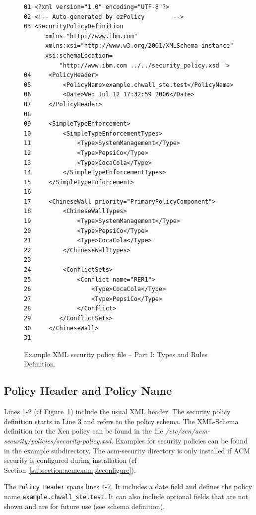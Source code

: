 \documentclass[11pt,twoside,final,openright]{report}
\begin{document}
\begin{figure}
\begin{scriptsize}
\begin{verbatim}
01 <?xml version="1.0" encoding="UTF-8"?>
02 <!-- Auto-generated by ezPolicy        -->
03 <SecurityPolicyDefinition
      xmlns="http://www.ibm.com"
      xmlns:xsi="http://www.w3.org/2001/XMLSchema-instance"
      xsi:schemaLocation=
          "http://www.ibm.com ../../security_policy.xsd ">
04     <PolicyHeader>
05         <PolicyName>example.chwall_ste.test</PolicyName>
06         <Date>Wed Jul 12 17:32:59 2006</Date>
07     </PolicyHeader>
08
09     <SimpleTypeEnforcement>
10         <SimpleTypeEnforcementTypes>
11             <Type>SystemManagement</Type>
12             <Type>PepsiCo</Type>
13             <Type>CocaCola</Type>
14         </SimpleTypeEnforcementTypes>
15     </SimpleTypeEnforcement>
16
17     <ChineseWall priority="PrimaryPolicyComponent">
18         <ChineseWallTypes>
19             <Type>SystemManagement</Type>
20             <Type>PepsiCo</Type>
21             <Type>CocaCola</Type>
22         </ChineseWallTypes>
23
24         <ConflictSets>
25             <Conflict name="RER1">
26                 <Type>CocaCola</Type>
27                 <Type>PepsiCo</Type>
28             </Conflict>
29        </ConflictSets>
30     </ChineseWall>
31
\end{verbatim}
\end{scriptsize}
\caption{Example XML security policy file -- Part I: Types and Rules Definition.}
\label{fig:acmxmlfilea}
\end{figure}

\subsection{Policy Header and Policy Name}
\label{subsection:acmnaming}
Lines 1-2 (cf Figure~\ref{fig:acmxmlfilea}) include the usual XML
header. The security policy definition starts in Line 3 and refers to
the policy schema. The XML-Schema definition for the Xen policy can be
found in the file
\textit{/etc/xen/acm-security/policies/security-policy.xsd}. Examples
for security policies can be found in the example subdirectory. The
acm-security directory is only installed if ACM security is configured
during installation (cf Section~\ref{subsection:acmexampleconfigure}).

The \verb|Policy Header| spans lines 4-7. It includes a date field and
defines the policy name \verb|example.chwall_ste.test|. It can also
include optional fields that are not shown and are for future use (see
schema definition).
\end{document}
